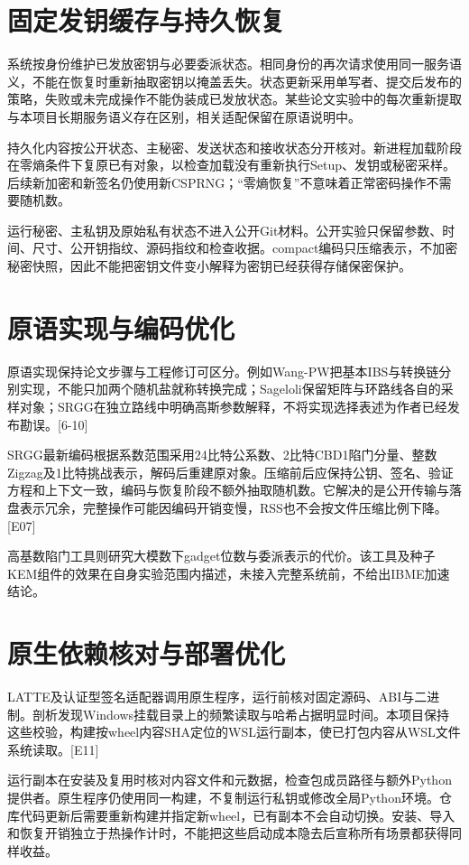 \documentclass[UTF8,a4paper,12pt,oneside,openany,fontset=fandol]{ctexrep}
\begin{document}
\section{固定发钥缓存与持久恢复}
系统按身份维护已发放密钥与必要委派状态。相同身份的再次请求使用同一服务语义，不能在恢复时重新抽取密钥以掩盖丢失。状态更新采用单写者、提交后发布的策略，失败或未完成操作不能伪装成已发放状态。某些论文实验中的每次重新提取与本项目长期服务语义存在区别，相关适配保留在原语说明中。

持久化内容按公开状态、主秘密、发送状态和接收状态分开核对。新进程加载阶段在零熵条件下复原已有对象，以检查加载没有重新执行Setup、发钥或秘密采样。后续新加密和新签名仍使用新CSPRNG；“零熵恢复”不意味着正常密码操作不需要随机数。

运行秘密、主私钥及原始私有状态不进入公开Git材料。公开实验只保留参数、时间、尺寸、公开钥指纹、源码指纹和检查收据。compact编码只压缩表示，不加密秘密快照，因此不能把密钥文件变小解释为密钥已经获得存储保密保护。

\section{原语实现与编码优化}
原语实现保持论文步骤与工程修订可区分。例如Wang-PW把基本IBS与转换链分别实现，不能只加两个随机盐就称转换完成；Sageloli保留矩阵与环路线各自的采样对象；SRGG在独立路线中明确高斯参数解释，不将实现选择表述为作者已经发布勘误。[6-10]

SRGG最新编码根据系数范围采用24比特公系数、2比特CBD1陷门分量、整数Zigzag及1比特挑战表示，解码后重建原对象。压缩前后应保持公钥、签名、验证方程和上下文一致，编码与恢复阶段不额外抽取随机数。它解决的是公开传输与落盘表示冗余，完整操作可能因编码开销变慢，RSS也不会按文件压缩比例下降。[E07]

高基数陷门工具则研究大模数下gadget位数与委派表示的代价。该工具及种子KEM组件的效果在自身实验范围内描述，未接入完整系统前，不给出IBME加速结论。

\section{原生依赖核对与部署优化}
LATTE及认证型签名适配器调用原生程序，运行前核对固定源码、ABI与二进制。剖析发现Windows挂载目录上的频繁读取与哈希占据明显时间。本项目保持这些校验，构建按wheel内容SHA定位的WSL运行副本，使已打包内容从WSL文件系统读取。[E11]

运行副本在安装及复用时核对内容文件和元数据，检查包成员路径与额外Python提供者。原生程序仍使用同一构建，不复制运行私钥或修改全局Python环境。仓库代码更新后需要重新构建并指定新wheel，已有副本不会自动切换。安装、导入和恢复开销独立于热操作计时，不能把这些启动成本隐去后宣称所有场景都获得同样收益。
\end{document}
